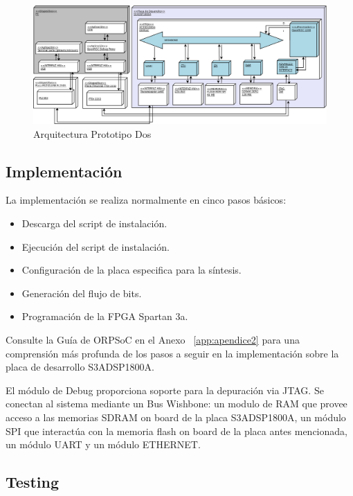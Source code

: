 		\begin{figure}[!h]
 		\begin{center}
  		\includegraphics[width=1\textwidth,keepaspectratio=true]{./images/orpsoc}
  		\caption{Arquitectura Prototipo Dos}
  		\label{fig:orpsoc} 
 		\end{center}
		\end{figure}
	
		\subsection{Implementación}

		La implementación se realiza normalmente en cinco pasos básicos: 
		\begin {itemize}
		\item Descarga del script de instalación.
		\item Ejecución del script de instalación.
		\item Configuración de la placa especifica para la síntesis.
		\item Generación del flujo de bits.
		\item Programación de la FPGA Spartan 3a.
 		\end {itemize}
 
 Consulte la Guía de ORPSoC en el Anexo ~\ref{app:apendice2} para una comprensión más profunda de los pasos a seguir en la implementación sobre la
 placa de desarrollo S3ADSP1800A.

El módulo de Debug proporciona soporte para la depuración via JTAG. Se conectan al sistema mediante un Bus Wishbone: un modulo de RAM que provee acceso a las memorias SDRAM on board de la placa S3ADSP1800A, un módulo SPI que interactúa con la memoria flash on board de la placa antes mencionada, un módulo UART y un módulo ETHERNET. 
		


\newpage
		\subsection{Testing}

